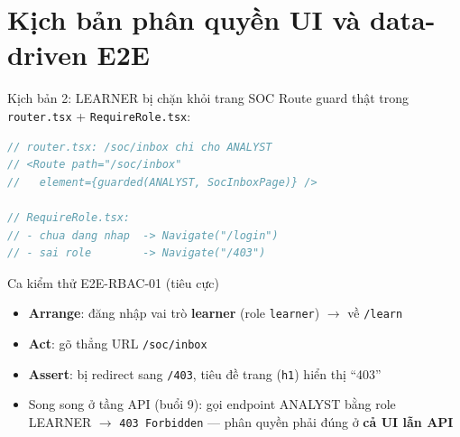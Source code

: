 \documentclass[aspectratio=169,12pt]{beamer}
\begin{document}
\section{Kịch bản phân quyền UI và data-driven E2E}

\begin{frame}[fragile]{Kịch bản 2: LEARNER bị chặn khỏi trang SOC}
  Route guard thật trong \texttt{router.tsx} + \texttt{RequireRole.tsx}:

\begin{lstlisting}[language=Java,basicstyle=\ttfamily\scriptsize]
// router.tsx: /soc/inbox chi cho ANALYST
// <Route path="/soc/inbox"
//   element={guarded(ANALYST, SocInboxPage)} />

// RequireRole.tsx:
// - chua dang nhap  -> Navigate("/login")
// - sai role        -> Navigate("/403")
\end{lstlisting}

  \begin{block}{Ca kiểm thử E2E-RBAC-01 (tiêu cực)}
    \begin{itemize}
      \item \textbf{Arrange}: đăng nhập vai trò \textbf{learner}
            (role \texttt{learner}) $\to$ về \texttt{/learn}
      \item \textbf{Act}: gõ thẳng URL \texttt{/soc/inbox}
      \item \textbf{Assert}: bị redirect sang \texttt{/403},
            tiêu đề trang (\texttt{h1}) hiển thị ``403''
    \end{itemize}
  \end{block}

  \begin{itemize}
    \item Song song ở tầng API (buổi 9): gọi endpoint ANALYST bằng
          role LEARNER $\to$ \texttt{403 Forbidden} --- phân quyền
          phải đúng ở \textbf{cả UI lẫn API}
  \end{itemize}
\end{frame}
\end{document}
